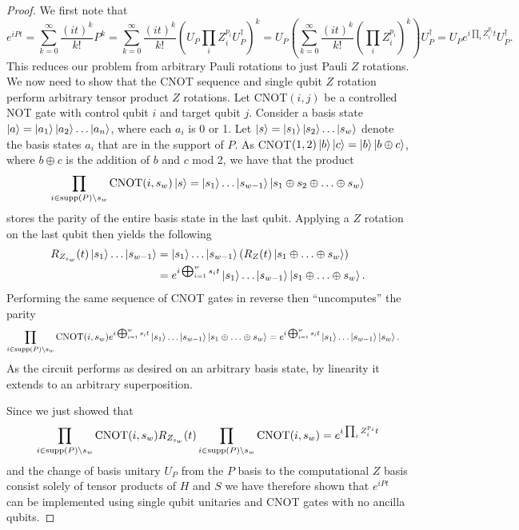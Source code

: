 \begin{proof}
    We first note that 
    \begin{equation}
        e^{i P t} = \sum_{k = 0}^\infty \frac{(i t)^k}{k!} P^k = \sum_{k = 0}^\infty \frac{(i t)^k}{k!} (U_P \prod_i Z_i^{p_i} U_P^\dagger)^k = U_P \left(\sum_{k = 0}^\infty \frac{(i t)^k}{k!} ( \prod_i Z_i^{p_i})^k \right) U_P^\dagger = U_P e^{i \prod_i Z_i^{p_i} t} U_P^\dagger.
    \end{equation}
    This reduces our problem from arbitrary Pauli rotations to just Pauli $Z$ rotations. We now need to show that the CNOT sequence and single qubit $Z$ rotation perform arbitrary tensor product $Z$ rotations. Let CNOT$(i,j)$ be a controlled NOT gate with control qubit $i$ and target qubit $j$. Consider a basis state $\ket{a} = \ket{a_1}\ket{a_2}\ldots \ket{a_n}$, where each $a_i$ is 0 or 1. Let $\ket{s} = \ket{s_1} \ket{s_2} \ldots \ket{s_w}$ denote the basis states $a_i$ that are in the support of $P$. As CNOT$(1,2) \ket{b}\ket{c} = \ket{b} \ket{b \oplus c}$, where $b \oplus c$ is the addition of $b$ and $c$ mod 2, we have that the product
    \begin{equation}
        \prod_{i \in {\rm supp}(P) \setminus s_w} {\rm CNOT}(i, s_w) \ket{s} = \ket{s_1} \ldots \ket{s_{w-1}} \ket{s_1 \oplus s_2 \oplus \ldots \oplus s_w}
    \end{equation}
    stores the parity of the entire basis state in the last qubit. Applying a $Z$ rotation on the last qubit then yields the following
    \begin{align}
        R_{Z_{s_w}}(t) \ket{s_1} \ldots \ket{s_{w-1}} &= \ket{s_1} \ldots \ket{s_{w- 1}} \left(R_Z(t) \ket{s_1 \oplus \ldots \oplus s_w} \right) \\
        &= e^{i \bigoplus_{i = 1}^w s_i t} \ket{s_1} \ldots \ket{s_{w- 1}} \ket{s_1 \oplus \ldots \oplus s_w}.
    \end{align}
    Performing the same sequence of CNOT gates in reverse then ``uncomputes'' the parity
    \begin{align}
        \prod_{i \in {\rm supp}(P) \setminus s_w} {\rm CNOT}(i, s_w) e^{i \bigoplus_{i = 1}^w s_i t} \ket{s_1} \ldots \ket{s_{w- 1}} \ket{s_1 \oplus \ldots \oplus s_w} &= e^{i \bigoplus_{i = 1}^w s_i t} \ket{s_1} \ldots \ket{s_{w- 1}} \ket{s_w}.
    \end{align}
    As the circuit performs as desired on an arbitrary basis state, by linearity it extends to an arbitrary superposition.

    Since we just showed that 
    \begin{equation}
    \prod_{i \in {\rm supp}(P) \setminus s_w} {\rm CNOT}(i, s_w) R_{Z_{s_w}}(t) \prod_{i \in {\rm supp}(P) \setminus s_w} {\rm CNOT}(i, s_w) = e^{i \prod_i Z_i^{p_i} t}
    \end{equation}
    and the change of basis unitary $U_P$ from the $P$ basis to the computational $Z$ basis consist solely of tensor products of $H$ and $S$ we have therefore shown that $e^{i P t}$ can be implemented using single qubit unitaries and CNOT gates with no ancilla qubits.
\end{proof}

